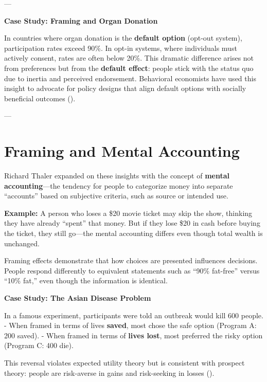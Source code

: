 \documentclass[11pt]{book}
\begin{document}
---

\begin{casebox}
\textbf{Case Study: Framing and Organ Donation}  

In countries where organ donation is the \textbf{default option} (opt-out system), participation rates exceed 90\%. In opt-in systems, where individuals must actively consent, rates are often below 20\%.  
This dramatic difference arises not from preferences but from the \textbf{default effect}: people stick with the status quo due to inertia and perceived endorsement.  
Behavioral economists have used this insight to advocate for policy designs that align default options with socially beneficial outcomes (\citealp{Johnson2003}).
\end{casebox}

---

\section*{Framing and Mental Accounting}

Richard Thaler expanded on these insights with the concept of \textbf{mental accounting}—the tendency for people to categorize money into separate “accounts” based on subjective criteria, such as source or intended use.

\begin{examplebox}
\textbf{Example:}  
A person who loses a \$20 movie ticket may skip the show, thinking they have already ``spent'' that money. But if they lose \$20 in cash before buying the ticket, they still go—the mental accounting differs even though total wealth is unchanged.
\end{examplebox}

Framing effects demonstrate that how choices are presented influences decisions. People respond differently to equivalent statements such as “90\% fat-free” versus “10\% fat,” even though the information is identical.

\begin{casebox}
\textbf{Case Study: The Asian Disease Problem}  

In a famous experiment, participants were told an outbreak would kill 600 people.  
- When framed in terms of lives \textbf{saved}, most chose the safe option (Program A: 200 saved).  
- When framed in terms of \textbf{lives lost}, most preferred the risky option (Program C: 400 die).  

This reversal violates expected utility theory but is consistent with prospect theory: people are risk-averse in gains and risk-seeking in losses (\citealp{Tversky1981}).
\end{casebox}
\end{document}
